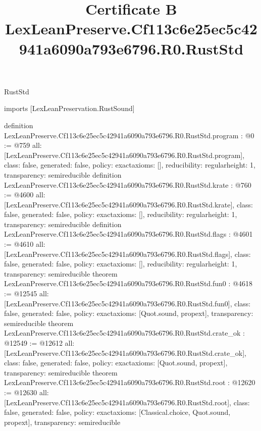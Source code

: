 \begin{lexlean}{RustStd}
\title{Certificate B LexLeanPreserve.Cf113c6e25ec5c42941a6090a793e6796.R0.RustStd}
\begin{coremodule}
imports [LexLeanPreservation.RustSound]

definition LexLeanPreserve.Cf113c6e25ec5c42941a6090a793e6796.R0.RustStd.program : @0 := @759 {
  all: [LexLeanPreserve.Cf113c6e25ec5c42941a6090a793e6796.R0.RustStd.program],
  class: false,
  generated: false,
  policy: exact{axioms: []},
  reducibility: regular{height: 1},
  transparency: semireducible
}
definition LexLeanPreserve.Cf113c6e25ec5c42941a6090a793e6796.R0.RustStd.krate : @760 := @4600 {
  all: [LexLeanPreserve.Cf113c6e25ec5c42941a6090a793e6796.R0.RustStd.krate],
  class: false,
  generated: false,
  policy: exact{axioms: []},
  reducibility: regular{height: 1},
  transparency: semireducible
}
definition LexLeanPreserve.Cf113c6e25ec5c42941a6090a793e6796.R0.RustStd.flags : @4601 := @4610 {
  all: [LexLeanPreserve.Cf113c6e25ec5c42941a6090a793e6796.R0.RustStd.flags],
  class: false,
  generated: false,
  policy: exact{axioms: []},
  reducibility: regular{height: 1},
  transparency: semireducible
}
theorem LexLeanPreserve.Cf113c6e25ec5c42941a6090a793e6796.R0.RustStd.fun0 : @4618 := @12545 {
  all: [LexLeanPreserve.Cf113c6e25ec5c42941a6090a793e6796.R0.RustStd.fun0],
  class: false,
  generated: false,
  policy: exact{axioms: [Quot.sound, propext]},
  transparency: semireducible
}
theorem LexLeanPreserve.Cf113c6e25ec5c42941a6090a793e6796.R0.RustStd.crate_ok : @12549 := @12612 {
  all: [LexLeanPreserve.Cf113c6e25ec5c42941a6090a793e6796.R0.RustStd.crate_ok],
  class: false,
  generated: false,
  policy: exact{axioms: [Quot.sound, propext]},
  transparency: semireducible
}
theorem LexLeanPreserve.Cf113c6e25ec5c42941a6090a793e6796.R0.RustStd.root : @12620 := @12630 {
  all: [LexLeanPreserve.Cf113c6e25ec5c42941a6090a793e6796.R0.RustStd.root],
  class: false,
  generated: false,
  policy: exact{axioms: [Classical.choice, Quot.sound, propext]},
  transparency: semireducible
}


\end{coremodule}
\end{lexlean}
